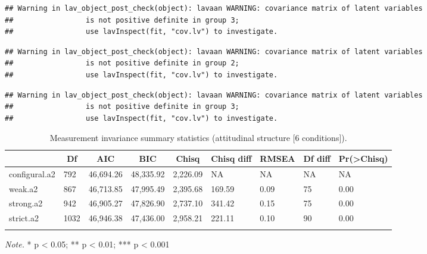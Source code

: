 \documentclass[
  man]{apa6}
\begin{document}
\begin{verbatim}
## Warning in lav_object_post_check(object): lavaan WARNING: covariance matrix of latent variables
##                 is not positive definite in group 3;
##                 use lavInspect(fit, "cov.lv") to investigate.
\end{verbatim}

\begin{verbatim}
## Warning in lav_object_post_check(object): lavaan WARNING: covariance matrix of latent variables
##                 is not positive definite in group 2;
##                 use lavInspect(fit, "cov.lv") to investigate.
\end{verbatim}

\begin{verbatim}
## Warning in lav_object_post_check(object): lavaan WARNING: covariance matrix of latent variables
##                 is not positive definite in group 3;
##                 use lavInspect(fit, "cov.lv") to investigate.
\end{verbatim}

\begin{table}[tbp]

\begin{center}
\begin{threeparttable}

\caption{\label{tab:measinv.siop2.att}Measurement invariance summary statistics (attitudinal structure [6 conditions]).}

\begin{tabular}{lllllllll}
\toprule
 & \multicolumn{1}{c}{Df} & \multicolumn{1}{c}{AIC} & \multicolumn{1}{c}{BIC} & \multicolumn{1}{c}{Chisq} & \multicolumn{1}{c}{Chisq diff} & \multicolumn{1}{c}{RMSEA} & \multicolumn{1}{c}{Df diff} & \multicolumn{1}{c}{Pr(>Chisq)}\\
\midrule
configural.a2 & 792 & 46,694.26 & 48,335.92 & 2,226.09 & NA & NA & NA & NA\\
weak.a2 & 867 & 46,713.85 & 47,995.49 & 2,395.68 & 169.59 & 0.09 & 75 & 0.00\\
strong.a2 & 942 & 46,905.27 & 47,826.90 & 2,737.10 & 341.42 & 0.15 & 75 & 0.00\\
strict.a2 & 1032 & 46,946.38 & 47,436.00 & 2,958.21 & 221.11 & 0.10 & 90 & 0.00\\
\bottomrule
\addlinespace
\end{tabular}

\begin{tablenotes}[para]
\normalsize{\textit{Note.} * p < 0.05; ** p < 0.01; *** p < 0.001}
\end{tablenotes}

\end{threeparttable}
\end{center}

\end{table}
\end{document}
